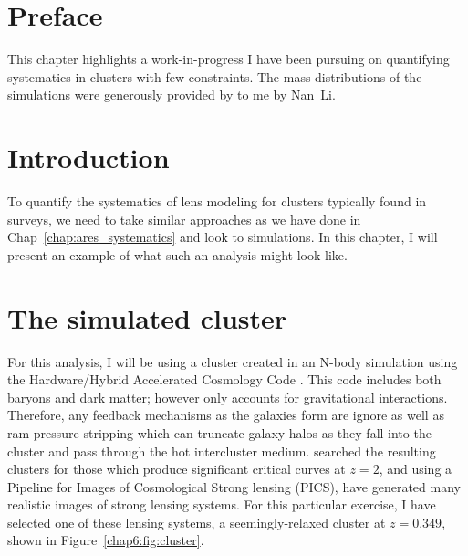 \section{Preface}

This chapter highlights a work-in-progress I have been pursuing on quantifying systematics in clusters with few constraints. The mass distributions of the simulations were generously provided by to me by Nan~Li.

\section{Introduction}

To quantify the systematics of lens modeling for clusters typically found in surveys, we need to take similar approaches as we have done in Chap~\ref{chap:ares_systematics} and look to simulations. In this chapter, I will present an example of what such an analysis might look like.

\section{The simulated cluster}

For this analysis, I will be using a cluster created in an N-body simulation using the Hardware/Hybrid Accelerated Cosmology Code \citep[HACC; ][]{Habib:2016cy}. This code includes both baryons and dark matter; however only accounts for gravitational interactions. Therefore, any feedback mechanisms as the galaxies form are ignore as well as ram pressure stripping which can truncate galaxy halos as they fall into the cluster and pass through the hot intercluster medium. \citet{Li:2016ek} searched the resulting clusters for those which produce significant critical curves at $z=2$, and using a Pipeline for Images of Cosmological Strong lensing (PICS), have generated many realistic images of strong lensing systems. For this particular exercise, I have selected one of these lensing systems, a seemingly-relaxed cluster at $z=0.349$, shown in Figure~\ref{chap6:fig:cluster}.

